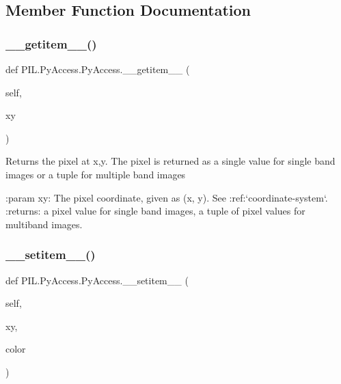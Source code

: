 \subsection{Member Function Documentation}
\mbox{\label{classPIL_1_1PyAccess_1_1PyAccess_a4d2b451c3f84d5652f627bc189689835}} 
\subsubsection{\texorpdfstring{\+\_\+\+\_\+getitem\+\_\+\+\_\+()}{\_\_getitem\_\_()}}
{\footnotesize\ttfamily def P\+I\+L.\+Py\+Access.\+Py\+Access.\+\_\+\+\_\+getitem\+\_\+\+\_\+ (\begin{DoxyParamCaption}\item[{}]{self,  }\item[{}]{xy }\end{DoxyParamCaption})}

\begin{DoxyVerb}Returns the pixel at x,y. The pixel is returned as a single
value for single band images or a tuple for multiple band
images

:param xy: The pixel coordinate, given as (x, y). See
  :ref:`coordinate-system`.
:returns: a pixel value for single band images, a tuple of
  pixel values for multiband images.
\end{DoxyVerb}
 \mbox{\label{classPIL_1_1PyAccess_1_1PyAccess_a9e3e4ded57321fd2b13e259fec7782f3}} 
\subsubsection{\texorpdfstring{\+\_\+\+\_\+setitem\+\_\+\+\_\+()}{\_\_setitem\_\_()}}
{\footnotesize\ttfamily def P\+I\+L.\+Py\+Access.\+Py\+Access.\+\_\+\+\_\+setitem\+\_\+\+\_\+ (\begin{DoxyParamCaption}\item[{}]{self,  }\item[{}]{xy,  }\item[{}]{color }\end{DoxyParamCaption})}

